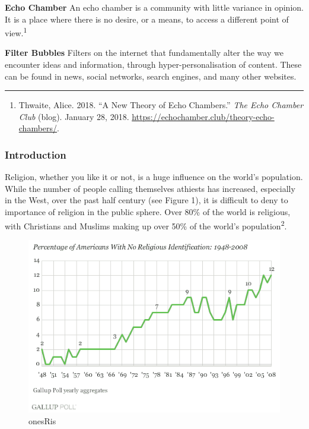 \documentclass[]{article}
\providecommand{\tightlist}{%
  \setlength{\itemsep}{0pt}\setlength{\parskip}{0pt}}
\begin{document}
\textbf{Echo Chamber} An echo chamber is a community with little
variance in opinion. It is a place where there is no desire, or a means,
to access a different point of view.\textsuperscript{1}

\textbf{Filter Bubbles } Filters on the internet that fundamentally
alter the way we encounter ideas and information, through
hyper-personalisation of content. These can be found in news, social
networks, search engines, and many other websites.

\begin{center}\rule{0.5\linewidth}{\linethickness}\end{center}

\begin{enumerate}
\def\labelenumi{\arabic{enumi}.}
\tightlist
\item
  Thwaite, Alice. 2018. ``A New Theory of Echo Chambers.'' \emph{The
  Echo Chamber Club} (blog). January 28, 2018.
  \url{https://echochamber.club/theory-echo-chambers/}.
\end{enumerate}

\hypertarget{introduction}{%
\subsubsection{Introduction}\label{introduction}}

Religion, whether you like it or not, is a huge influence on the world's
population. While the number of people calling themselves athiests has
increased, especially in the West, over the past half century (see
Figure 1), it is difficult to deny to importance of religion in the
public sphere. Over 80\% of the world is religious, with Christians and
Muslims making up over 50\% of the world's
population\textsuperscript{2}.

\begin{figure}
\centering
\includegraphics{./NonesRise.png}
\caption{onesRis}
\end{figure}
\end{document}
